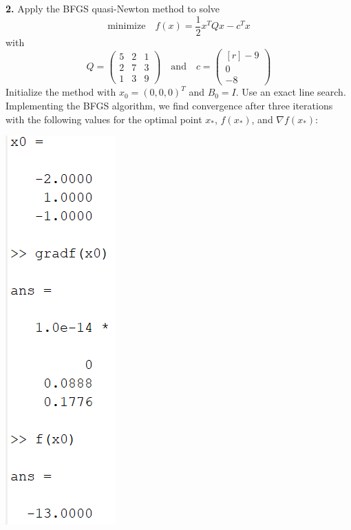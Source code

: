 \documentclass{article}
\newcommand{\minimize}[0]{\text{minimize}}
\begin{document}
\textbf{2.}
Apply the BFGS quasi-Newton method to solve
\[\minimize \hspace{1em} f(x) = \frac{1}{2}x^TQx - c^Tx\]
with
\[Q = \begin{pmatrix}
    5 & 2 & 1\\
    2 & 7 & 3\\
    1 & 3 & 9
\end{pmatrix}
\hspace{1em} \text{and} \hspace{1em}
c = \begin{pmatrix*}[r]
    -9\\
    0\\
    -8
\end{pmatrix*}\]
Initialize the method with $x_0 = (0,0,0)^T$ and $B_0 = I$. Use an exact line search.
\newline\newline
Implementing the BFGS algorithm, we find convergence after three iterations with the following values for the optimal point $x_*$, $f(x_*)$, and $\nabla f(x_*)$:
\begin{center}
    \includegraphics[scale = 0.9]{bfgsvals}
\end{center}
\end{document}
